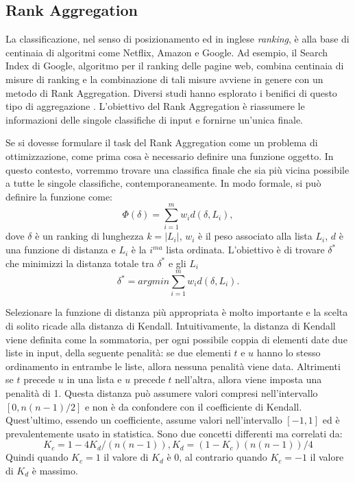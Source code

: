 \subsection{Rank Aggregation}
La classificazione, nel senso di posizionamento ed in inglese \textit{ranking}, è alla base di centinaia di algoritmi come Netflix, Amazon e Google. 
Ad esempio, il Search Index di Google, algoritmo per il ranking delle pagine web, combina centinaia di misure di ranking e la combinazione di tali misure avviene in genere con un metodo di Rank Aggregation. Diversi studi hanno esplorato i benifici di questo tipo di aggregazione \cite{https://doi.org/10.48550/arxiv.2206.12088,https://doi.org/10.48550/arxiv.2202.05433}.
L'obiettivo del Rank Aggregation è riassumere le informazioni delle singole classifiche di input e fornirne un'unica finale. 

Se si dovesse formulare il task del Rank Aggregation come un problema di ottimizzazione, come prima cosa è necessario definire una funzione oggetto. In questo contesto, vorremmo trovare una classifica finale che sia più vicina possibile a tutte le singole classifiche, contemporaneamente. In modo formale, si può definire la funzione come: \[ \Phi(\delta) = \sum_{i=1}^{m} w_id(\delta,L_i), \]	
dove $\delta$ è un ranking di lunghezza $k=|L_i|$, $w_i$ è il peso associato alla lista $L_i$, $d$ è una funzione di distanza e $L_i$ è la $i^{ma}$ lista ordinata.
L'obiettivo è di trovare $\delta^*$ che minimizzi la distanza totale tra $\delta^*$ e gli $L_i$
\[ \delta^* = arg min \sum_{i=1}^{m} w_id(\delta,L_i). \]

Selezionare la funzione di distanza più appropriata è molto importante e la scelta di solito ricade alla distanza di Kendall.
Intuitivamente, la distanza di Kendall viene definita come la sommatoria, per ogni possibile coppia di elementi date due liste in input, della seguente penalità: se due elementi $t$ e $u$ hanno lo stesso ordinamento in entrambe le liste, allora nessuna penalità viene data. Altrimenti se $t$ precede $u$ in una lista e $u$ precede $t$ nell'altra, allora viene imposta una penalità di 1.
Questa distanza può assumere valori compresi nell'intervallo $[0,n(n-1)/2]$ e non è da confondere con il coefficiente di Kendall. Quest'ultimo, essendo un coefficiente, assume valori nell'intervallo $[-1,1]$ ed è prevalentemente usato in statistica. Sono due concetti differenti ma correlati da:
\[K_c=1-4K_d/(n(n-1)), K_d = (1-K_c)(n(n-1))/4\]
Quindi quando $K_c=1$ il valore di $K_d$ è 0, al contrario quando $K_c=-1$ il valore di $K_d$ è massimo.

